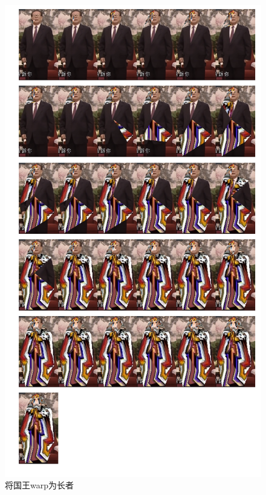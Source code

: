 \documentclass{beamer}
\begin{document}
\begin{frame}

\begin{figure}[htb]
    \includegraphics[width=0.3\linewidth]{tri_king2elder.png}
    \caption{将国王warp为长者}
    \label{fig:king2elder}
\end{figure}

\end{frame}
\end{document}
